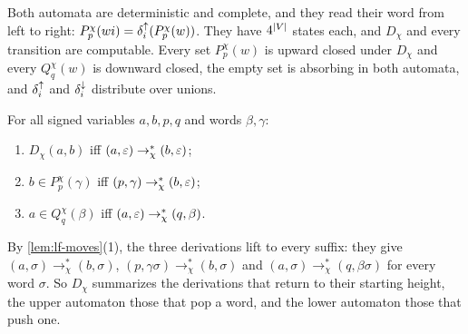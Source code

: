 Both automata are deterministic and complete, and they read their word from
left to right: $P^\chi_p(wi)=\delta^{\uparrow}_{i}(P^\chi_p(w))$. They have $4^{\lvert V\rvert}$
states each, and $D_\chi$ and every transition are computable. Every set $P^\chi_p(w)$ is upward closed
under $D_\chi$ and every $Q^\chi_q(w)$ is downward closed, the empty set is
absorbing in both automata, and $\delta^{\uparrow}_{i}$ and $\delta^{\downarrow}_{i}$ distribute over
unions.

\begin{lemma}\label{lem:sm-summaries}
For all signed variables $a,b,p,q$ and words $\beta,\gamma$:
\begin{enumerate}[label=(\alph*),leftmargin=*]
\item $D_\chi(a,b)$ iff $(a,\varepsilon)\to^*_\chi(b,\varepsilon)$;
\item $b\in P^\chi_p(\gamma)$ iff $(p,\gamma)\to^*_\chi(b,\varepsilon)$;
\item $a\in Q^\chi_q(\beta)$ iff $(a,\varepsilon)\to^*_\chi(q,\beta)$.
\end{enumerate}
\end{lemma}

By \cref{lem:lf-moves}(1), the three derivations lift to every suffix: they
give $(a,\sigma)\to^*_\chi(b,\sigma)$, $(p,\gamma\sigma)\to^*_\chi(b,\sigma)$
and $(a,\sigma)\to^*_\chi(q,\beta\sigma)$ for every word $\sigma$. So $D_\chi$
summarizes the derivations that return to their starting height, the upper
automaton those that pop a word, and the lower automaton those that push one.

